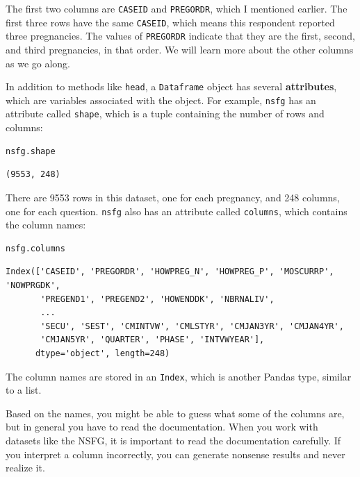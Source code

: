 The first two columns are \passthrough{\lstinline!CASEID!} and
\passthrough{\lstinline!PREGORDR!}, which I mentioned earlier. The first
three rows have the same \passthrough{\lstinline!CASEID!}, which means
this respondent reported three pregnancies. The values of
\passthrough{\lstinline!PREGORDR!} indicate that they are the first,
second, and third pregnancies, in that order. We will learn more about
the other columns as we go along.

In addition to methods like \passthrough{\lstinline!head!}, a
\passthrough{\lstinline!Dataframe!} object has several
\textbf{attributes}, which are variables associated with the object. For
example, \passthrough{\lstinline!nsfg!} has an attribute called
\passthrough{\lstinline!shape!}, which is a tuple containing the number
of rows and columns:

\begin{lstlisting}[language=Python,style=source]
nsfg.shape
\end{lstlisting}

\begin{lstlisting}[style=output]
(9553, 248)
\end{lstlisting}

There are 9553 rows in this dataset, one for each pregnancy, and 248
columns, one for each question. \passthrough{\lstinline!nsfg!} also has
an attribute called \passthrough{\lstinline!columns!}, which contains
the column names:

\begin{lstlisting}[language=Python,style=source]
nsfg.columns
\end{lstlisting}

\begin{lstlisting}[style=output]
Index(['CASEID', 'PREGORDR', 'HOWPREG_N', 'HOWPREG_P', 'MOSCURRP', 'NOWPRGDK',
       'PREGEND1', 'PREGEND2', 'HOWENDDK', 'NBRNALIV',
       ...
       'SECU', 'SEST', 'CMINTVW', 'CMLSTYR', 'CMJAN3YR', 'CMJAN4YR',
       'CMJAN5YR', 'QUARTER', 'PHASE', 'INTVWYEAR'],
      dtype='object', length=248)
\end{lstlisting}

The column names are stored in an \passthrough{\lstinline!Index!}, which
is another Pandas type, similar to a list.

Based on the names, you might be able to guess what some of the columns
are, but in general you have to read the documentation. When you work
with datasets like the NSFG, it is important to read the documentation
carefully. If you interpret a column incorrectly, you can generate
nonsense results and never realize it.

